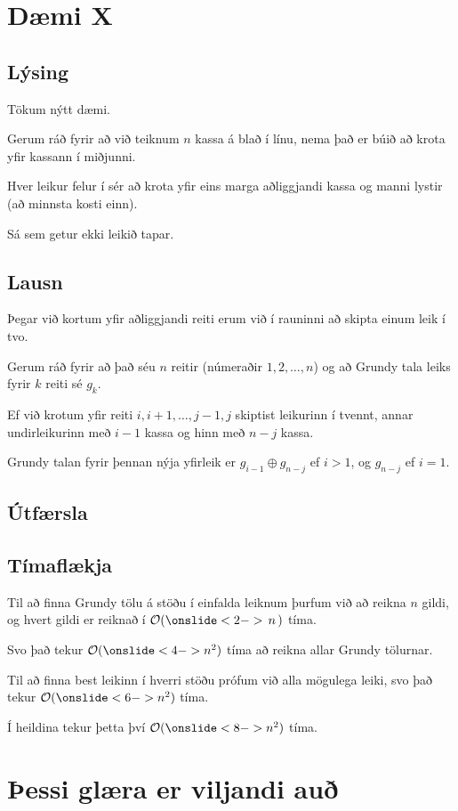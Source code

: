 \section{Dæmi X}
\subsection{Lýsing}
{
    {
        \item<1-> Tökum nýtt dæmi.
        \item<2-> Gerum ráð fyrir að við teiknum $n$ kassa á blað í línu, nema það er búið að krota yfir kassann í miðjunni.
        \item<4-> Hver leikur felur í sér að krota yfir eins marga aðliggjandi kassa og manni lystir (að minnsta kosti einn).
        \item<5-> Sá sem getur ekki leikið tapar.
    }
}

\subsection{Lausn}
{
    {
        \item<1-> Þegar við kortum yfir aðliggjandi reiti erum við í rauninni að skipta einum leik í tvo.
        \item<2-> Gerum ráð fyrir að það séu $n$ reitir (númeraðir $1, 2, \dots, n$) og að Grundy tala leiks fyrir $k$ reiti sé $g_k$.
        \item<3-> Ef við krotum yfir reiti $i, i + 1, \dots, j - 1, j$ skiptist leikurinn í tvennt,
                    annar undirleikurinn með $i - 1$ kassa og hinn með $n - j$ kassa.
        \item<4-> Grundy talan fyrir þennan nýja yfirleik er $g_{i - 1} \oplus g_{n - j}$ ef $i > 1$,
                    og $g_{n - j}$ ef $i = 1$.
    }
}

\subsection{Útfærsla}
{
}

{
}

\subsection{Tímaflækja}
{
    {
        \item<1-> Til að finna Grundy tölu á stöðu í einfalda leiknum þurfum við að reikna $n$ gildi,
                    og hvert gildi er reiknað í $\mathcal{O}(\onslide<2->{\,n\,})$ tíma.
        \item<3-> Svo það tekur $\mathcal{O}(\onslide<4->{n^2})$ tíma að reikna allar Grundy tölurnar.
        \item<5-> Til að finna best leikinn í hverri stöðu prófum við alla mögulega leiki, svo það tekur
                    $\mathcal{O}(\onslide<6->{n^2})$ tíma.
        \item<7-> Í heildina tekur þetta því $\mathcal{O}(\onslide<8->{n^2})$ tíma.
    }
}

\section{Þessi glæra er viljandi auð}
{
}


